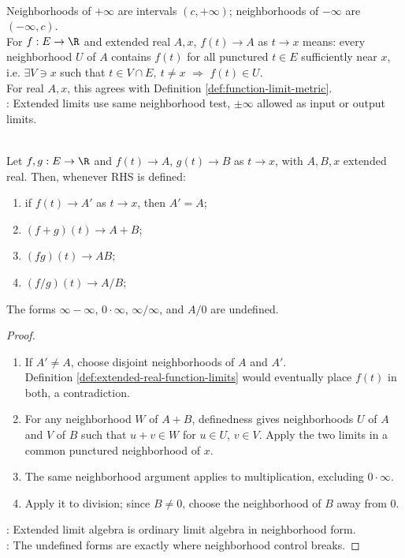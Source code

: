 \begin{definition} \label{def:extended-real-function-limits} \\
Neighborhoods of $+\infty$ are intervals $(c,+\infty)$; neighborhoods of $-\infty$ are $(-\infty,c)$.\\
For $f:E\to\R$ and extended real $A,x$, $f(t)\to A$ as $t\to x$ means: every neighborhood $U$ of $A$ contains $f(t)$ for all punctured $t\in E$ sufficiently near $x$, i.e. $\exists V\ni x$ such that $t\in V\cap E,\ t\neq x$ $\Longrightarrow$ $f(t)\in U$.\\
For real $A,x$, this agrees with Definition \ref{def:function-limit-metric}.\\
: Extended limits use same neighborhood test, $\pm\infty$ allowed as input or output limits.
\end{definition}

\begin{theorem} \label{thm:extended-limit-algebra} \\
Let $f,g:E\to\R$ and $f(t)\to A$, $g(t)\to B$ as $t\to x$, with $A,B,x$ extended real. Then, whenever RHS is defined:
\begin{enumerate}[label=(\roman*)]
\setlength{\itemsep}{0pt}
\item if $f(t)\to A'$ as $t\to x$, then $A'=A$;
\item $(f+g)(t)\to A+B$;
\item $(fg)(t)\to AB$;
\item $(f/g)(t)\to A/B$;
\end{enumerate}
The forms $\infty-\infty$, $0\cdot\infty$, $\infty/\infty$, and $A/0$ are undefined.
\begin{proof}
\begin{enumerate}[label=(\roman*)]
\setlength{\itemsep}{0pt}
\item If $A'\neq A$, choose disjoint neighborhoods of $A$ and $A'$.\\
Definition \ref{def:extended-real-function-limits} would eventually place $f(t)$ in both, a contradiction.
\item For any neighborhood $W$ of $A+B$, definedness gives neighborhoods $U$ of $A$ and $V$ of $B$ such that $u+v\in W$ for $u\in U$, $v\in V$. Apply the two limits in a common punctured neighborhood of $x$.
\item The same neighborhood argument applies to multiplication, excluding $0\cdot\infty$.
\item Apply it to division; since $B\neq0$, choose the neighborhood of $B$ away from $0$.
\end{enumerate}
: Extended limit algebra is ordinary limit algebra in neighborhood form.\\
: The undefined forms are exactly where neighborhood control breaks.
\end{proof}
\end{theorem}

